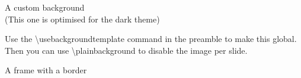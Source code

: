 \documentclass[mathserif, fleqn, aspectratio=169]{beamer}
\begin{document}
{
  \begin{frame}
    \begin{center}\huge
      A custom background\\
      \small\color{aiphitext!50!aiphibackground}
      (This one is optimised for the dark theme)
    \end{center}

    Use the \textbackslash{}usebackgroundtemplate command in the preamble to make this global.
    Then you can use \textbackslash{}plainbackground to disable the image per slide.
  \end{frame}
}

\begin{frame}[border=aiphipetrol]
  \begin{center}\huge
    A frame with a border
  \end{center}
\end{frame}
\end{document}
